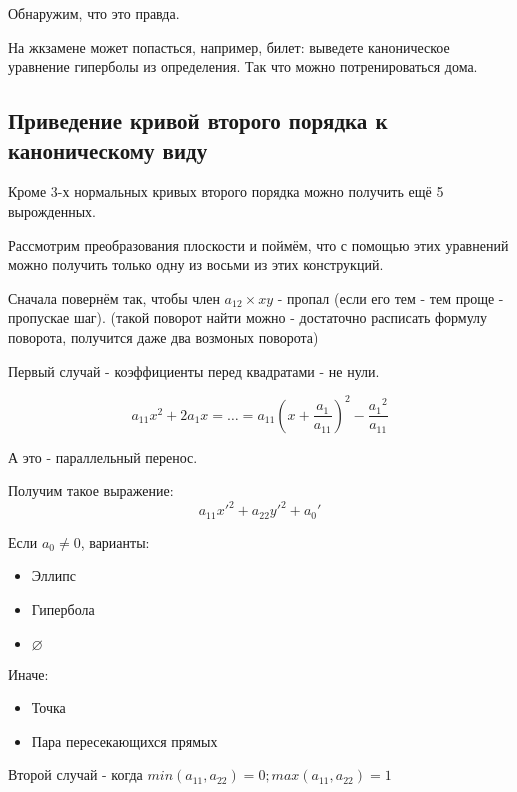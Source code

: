 \documentclass[12pt, a4paper]{article}
\begin{document}
    Обнаружим, что это правда.

    \begin{note}
        На жкзамене может попасться, например, билет: выведете каноническое уравнение гиперболы из определения.
        Так что можно потренироваться дома.
    \end{note}


    \subsection{Приведение кривой второго порядка к каноническому виду}

    Кроме 3-х нормальных кривых второго порядка можно получить ещё 5 вырожденных.

    Рассмотрим преобразования плоскости и поймём, 
    что с помощью этих уравнений можно получить только одну из восьми из этих конструкций.

    Сначала повернём так, чтобы член $a_{12} \times xy$ - пропал (если его тем - тем проще - пропускае шаг).
    (такой поворот найти можно - достаточно расписать формулу поворота, получится даже два возмоных поворота)

    Первый случай - коэффициенты перед квадратами - не нули.

    \begin{equation}
        a_{11} x^2 + 2a_1 x = \dots = a_{11} \left(x + \frac{a_1}{a_{11}}\right)^2 - \frac{{a_1}^2}{a_{11}}
    \end{equation}

    А это - параллельный перенос.

    Получим такое выражение:
    \begin{equation}
        a_{11} x'^2 + a_{22} y'^2 + a_0'
    \end{equation}

    Если $a_0 \neq 0$, варианты:
    \begin{itemize}
        \item Эллипс
        \item Гипербола
        \item $\varnothing$
    \end{itemize}

    Иначе:
    \begin{itemize}
        \item Точка
        \item Пара пересекающихся прямых
    \end{itemize}

    Второй случай - когда $min(a_{11}, a_{22}) = 0; max(a_{11}, a_{22}) = 1$
\end{document}
